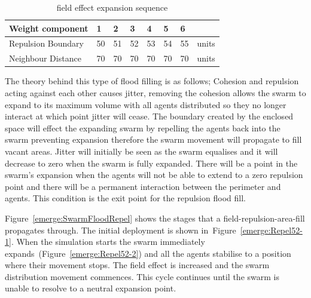 \begin{table}[H]
\begin{center}
\begin{tabular}{| p{2cm} | p{0.6cm} | p{0.6cm} | p{0.6cm} | p{0.6cm} | p{0.6cm} | p{0.6cm} | p{1cm} |}
\hline
\bf Weight \bf component & \bf 1 & \bf 2 & \bf 3 & \bf 4 & \bf 5 & \bf 6 & \\ \hline
Repulsion Boundary & 50 & 51 & 52 & 53 & 54 & 55 & units\\  \hline
Neighbour Distance & 70 & 70 & 70 & 70 & 70 & 70 & units\\  \hline
\end{tabular}\caption{field effect expansion sequence} \label{tab:emerge:BaselineConcaveReduction}
\end{center}
\end{table}

The theory behind this type of flood filling is as follows; Cohesion and repulsion acting against each other causes jitter, removing the cohesion allows the swarm to expand to its maximum volume with all agents distributed so they no longer interact at which point jitter will cease. The boundary created by the enclosed space will effect the expanding swarm by repelling the agents back into the swarm preventing expansion therefore the swarm movement will propagate to fill vacant areas. Jitter will initially be seen as the swarm equalises and it will decrease to zero when the swarm is fully expanded. There will be a point in the swarm's expansion when the agents will not be able to extend to a zero repulsion point and there will be a permanent interaction between the perimeter and agents. This condition is the exit point for the repulsion flood fill.

Figure~\ref{emerge:SwarmFloodRepel} shows the stages that a field-repulsion-area-fill propagates through. The initial deployment is shown in~Figure~\ref{emerge:Repel52-1}. When the simulation starts the swarm immediately expands~(Figure~\ref{emerge:Repel52-2}) and all the agents stabilise to a position where their movement stops. The field effect is increased and the swarm distribution movement commences. This cycle continues until the swarm is unable to resolve to a neutral expansion point.

